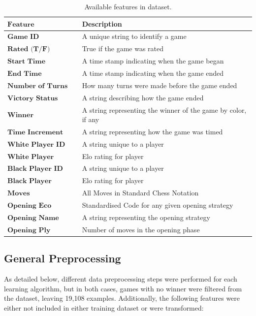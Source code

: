 \documentclass[12pt]{article}
\begin{document}
\begin{table}[H]
\centering
\begin{tabular}{|l|l|}
\hline
$\textbf{Feature}$ & Description \\ \hline
$\textbf{Game ID}$ & A unique string to identify a game \\ \hline
$\textbf{Rated (T/F)}$ & True if the game was rated \\ \hline
$\textbf{Start Time}$ & A time stamp indicating when the game began \\ \hline
$\textbf{End Time}$ & A time stamp indicating when the game ended \\ \hline
$\textbf{Number of Turns}$ & How many turns were made before the game ended \\ \hline
$\textbf{Victory Status}$ & A string describing how the game ended \\ \hline
$\textbf{Winner}$ & A string representing the winner of the game by color, if any \\ \hline
$\textbf{Time Increment}$ & A string representing how the game was timed \\ \hline
$\textbf{White Player ID}$ & A string unique to a player \\ \hline
$\textbf{White Player Rating}$ & Elo rating for player \\ \hline
$\textbf{Black Player ID}$ & A string unique to a player \\ \hline
$\textbf{Black Player Rating}$ & Elo rating for player \\ \hline
$\textbf{Moves}$ & All Moves in Standard Chess Notation \\ \hline
$\textbf{Opening Eco}$ & Standardised Code for any given opening strategy \\ \hline
$\textbf{Opening Name}$ & A string representing the opening strategy \\ \hline
$\textbf{Opening Ply}$ & Number of moves in the opening phase \\ \hline
\end{tabular}
\caption{Available features in dataset.}
\label{tab:features}
\end{table}

\subsection{General Preprocessing}
As detailed below, different data preprocessing steps were performed for each learning algorithm, but in both cases, games with no winner were filtered from the dataset, leaving 19,108 examples. Additionally, the following features were either not included in either training dataset or were transformed:
\end{document}
